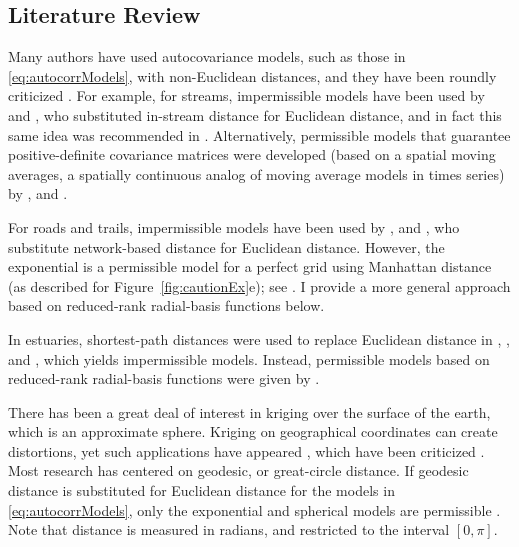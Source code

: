 \documentclass[11pt, titlepage]{article}\usepackage[]{graphicx}\usepackage[]{color}
\begin{document}
\begin{spacing}{1.9}
\begin{flushleft}
\subsection*{Literature Review}

Many authors have used autocovariance models, such as those in \ref{eq:autocorrModels}, with non-Euclidean distances, and they have been roundly criticized \citep{Curr:NonE:2006}.  For example, for streams, impermissible models have been used by \citet{Cres:Maju:spat:1997} and \citet{Gard:Sull:Lemb:pred:2003}, who substituted in-stream distance for Euclidean distance, and in fact this same idea was recommended in \citet{Okab:Sugi:spat:2012}. Alternatively, permissible models that guarantee positive-definite covariance matrices were developed (based on a spatial moving averages, a spatially continuous analog of moving average models in times series) by \citet{Ver:Pete:Theo:spat:2006}, \citet{Cres:Frey:Harc:Smit:spat:2006} and \citet{Ver:Pete:Move:2010}. 

For roads and trails, impermissible models have been used by \citet{Shio:Shio:stre:2011}, \citet{Selb:Kock:spat:2013} and \citet{Ladl:Avga:Whea:Boyc:pred:2016}, who substitute network-based distance for Euclidean distance.  However, the exponential is a permissible model for a perfect grid using Manhattan distance (as described for Figure~\ref{fig:cautionEx}e); see \citet{Curr:NonE:2006}. I provide a more general approach based on reduced-rank radial-basis functions below. 

In estuaries, shortest-path distances were used to replace Euclidean distance in \citet{Litt:Edwa:Port:krig:1997}, \citet{Rath:spat:1998}, and \citet{Jens:Chri:Mill:land:2006}, which yields impermissible models.  Instead, permissible models based on reduced-rank radial-basis functions were given by \citet{Wang:Rana:low:2007}.  

There has been a great deal of interest in kriging over the surface of the earth, which is an approximate sphere.  Kriging on geographical coordinates can create distortions, yet such applications have appeared \citep{Ecke:Gelf:baye:1997,Kalu:Vega:Card:Shel:anal:1998}, which have been criticized \citep{Bane:geod:2005}. Most research has centered on geodesic, or great-circle distance. If geodesic distance is substituted for Euclidean distance for the models in \ref{eq:autocorrModels}, only the exponential and spherical models are permissible \citep{Gnei:stri:2013}.  Note that distance is measured in radians, and restricted to the interval $[0,\pi]$.


\end{flushleft}
\end{spacing}
\end{document}
